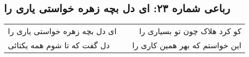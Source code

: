 \begin{center}
\section*{رباعی شماره ۲۳: ای دل بچه زهره خواستی یاری را}
\label{sec:0023}
\begin{longtable}{l p{0.5cm} r}
ای دل بچه زهره خواستی یاری را
&&
کو کرد هلاک چون تو بسیاری را
\\
دل گفت که تا شوم همه یکتائی
&&
این خواستم که بهر همین کاری را
\\
\end{longtable}
\end{center}
